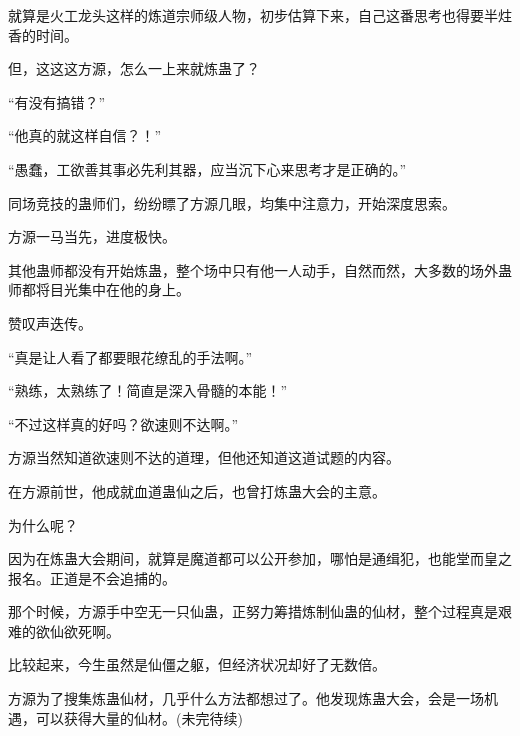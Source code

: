 \begin{this_body}
就算是火工龙头这样的炼道宗师级人物，初步估算下来，自己这番思考也得要半炷香的时间。

但，这这这方源，怎么一上来就炼蛊了？

“有没有搞错？”

“他真的就这样自信？！”

“愚蠢，工欲善其事必先利其器，应当沉下心来思考才是正确的。”

同场竞技的蛊师们，纷纷瞟了方源几眼，均集中注意力，开始深度思索。

方源一马当先，进度极快。

其他蛊师都没有开始炼蛊，整个场中只有他一人动手，自然而然，大多数的场外蛊师都将目光集中在他的身上。

赞叹声迭传。

“真是让人看了都要眼花缭乱的手法啊。”

“熟练，太熟练了！简直是深入骨髓的本能！”

“不过这样真的好吗？欲速则不达啊。”

方源当然知道欲速则不达的道理，但他还知道这道试题的内容。

在方源前世，他成就血道蛊仙之后，也曾打炼蛊大会的主意。

为什么呢？

因为在炼蛊大会期间，就算是魔道都可以公开参加，哪怕是通缉犯，也能堂而皇之报名。正道是不会追捕的。

那个时候，方源手中空无一只仙蛊，正努力筹措炼制仙蛊的仙材，整个过程真是艰难的欲仙欲死啊。

比较起来，今生虽然是仙僵之躯，但经济状况却好了无数倍。

方源为了搜集炼蛊仙材，几乎什么方法都想过了。他发现炼蛊大会，会是一场机遇，可以获得大量的仙材。(未完待续)

\end{this_body}

